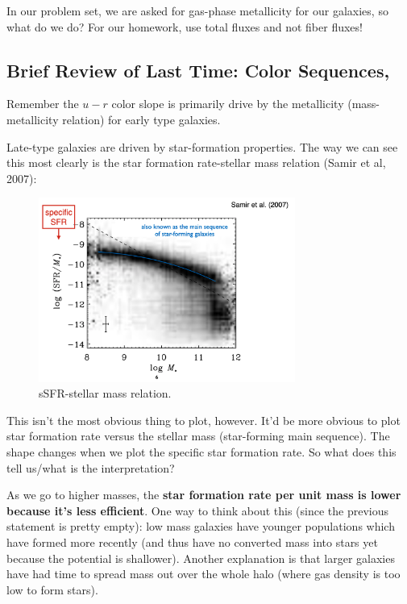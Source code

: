 \documentclass{article}
\begin{document}
In our problem set, we are asked for gas-phase metallicity for our galaxies, so what do we do? For our homework, use total fluxes and not fiber fluxes! 
\subsection{Brief Review of Last Time: Color Sequences, }

Remember the $u-r$ color slope is primarily drive by the metallicity (mass-metallicity relation) for early type galaxies. 

Late-type galaxies are driven by star-formation properties. The way we can see this most clearly is the star formation rate-stellar mass relation (Samir et al, 2007):

\begin{figure}
    \centering
    \includegraphics[width=0.75\textwidth]{figs/Screen Shot 2021-09-03 at 11.28.46 AM.png}
    \caption{sSFR-stellar mass relation. }
    \label{fig:ssfr_sm}
\end{figure}

This isn't the most obvious thing to plot, however. It'd be more obvious to plot star formation rate versus the stellar mass (star-forming main sequence). The shape changes when we plot the specific star formation rate. So what does this tell us/what is the interpretation?

As we go to higher masses, the \textbf{star formation rate per unit mass is lower because it's less efficient}. One way to think about this (since the previous statement is pretty empty): low mass galaxies have younger populations which have formed more recently (and thus have no converted mass into stars yet because the potential is shallower). Another explanation is that larger galaxies have had time to spread mass out over the whole halo (where gas density is too low to form stars). 
\end{document}
